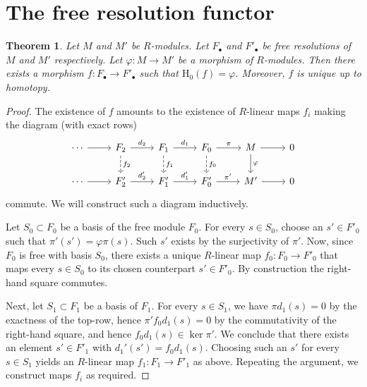 \documentclass[11pt]{amsbook}
\def\rH{{\mathrm H}} \def\rK{{\mathrm K}} \def\rR{{\mathrm R}}
\theoremstyle{plain}
\newtheorem{theorem}{Theorem}
\theoremstyle{definition}
\begin{document}
\section{The free resolution functor}


\begin{theorem}\label{thm:functoriality-of-free-resolutions}
Let $M$ and $M'$ be $R$-modules. Let $F_\bullet$ and $F'_\bullet$ be free resolutions of $M$ and $M'$ respectively. Let $\varphi \colon M\to M'$ be a morphism of $R$-modules. Then there exists a morphism
$f\colon F_\bullet \to F'_\bullet$ such that $\rH_0(f) = \varphi$. Moreover, $f$ is unique up to homotopy.
\end{theorem}

\begin{proof}
The existence of $f$ amounts to the existence of $R$-linear maps $f_i$ making the diagram 
(with exact rows)
\[
\begin{tikzcd}
\cdots \arrow{r} & 
	F_2 \arrow[dashed]{d}{f_2} \arrow{r}{d_2} &
	F_1 \arrow[dashed]{d}{f_1} \arrow{r}{d_1} & 
	F_0 \arrow[dashed]{d}{f_0} \arrow{r}{\pi} & M \arrow{d}{\varphi} \arrow{r} & 0 \\
\cdots \arrow{r} & 
	F_2'  \arrow{r}{d'_2} & 
	F_1'  \arrow{r}{d'_1} & 
	F_0' \arrow{r}{\pi'} & M'  \arrow{r} & 0 
\end{tikzcd}
\]
commute. We will construct such a diagram inductively.

 Let $S_0\subset F_0$ be a basis of the free module $F_0$. For every $s\in S_0$, choose an $s'\in F'_0$ such that $\pi'(s')=\varphi\pi(s)$. Such $s'$ exists by the surjectivity of $\pi'$. Now, since $F_0$ is free with basis $S_0$, there exists a unique $R$-linear map $f_0\colon F_0\to F'_0$ that maps every $s\in S_0$ to its chosen counterpart $s'\in F'_0$. By construction the right-hand square commutes. 

Next, let $S_1\subset F_1$ be a basis of $F_1$. For every $s\in S_1$, we have $\pi d_1(s)=0$ by the exactness of the top-row, hence $\pi' f_0 d_1(s) = 0$ by the commutativity of the right-hand square, and hence $f_0d_1(s) \in \ker \pi'$. We conclude that there exists an element $s'\in F'_1$ with $d_1'(s') = f_0d_1(s)$. Choosing such an $s'$ for every $s\in S_1$ yields an $R$-linear map $f_1\colon F_1 \to F'_1$ as above. Repeating the argument, we construct maps $f_i$ as required.


\end{proof}
\end{document}
